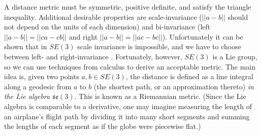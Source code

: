 \documentclass[letterpaper, 10 pt, conference]{ieeeconf}  %
\begin{document}
A distance metric must be symmetric, positive definite, and satisfy the triangle inequality. Additional desirable properties are scale-invariance ($||a-b||$ should not depend on the units of each dimension) and bi-invariance (left $||a-b|| = ||ca-cb||$ and right $||a-b|| = ||ac-bc||$). Unfortunately it can be shown that in $SE(3)$ scale invariance is impossible, and we have to choose between left- and right-invariance \cite{Park1995}. Fortunately, however, $SE(3)$ is a Lie group, so we can use techniques from calculus to derive an acceptable metric. The main idea is, given two points $a, b \in SE(3)$, the distance is defined as a line integral along a geodesic from $a$ to $b$ (the shortest path, or an approximation thereto) \emph{in the Lie algebra $\mathfrak{se}(3)$}. This is known as a Riemannian metric. (Since the Lie algebra is comparable to a derivative, one may imagine measuring the length of an airplane's flight path by dividing it into many short segments and summing the lengths of each segment as if the globe were piecewise flat.)
\end{document}

